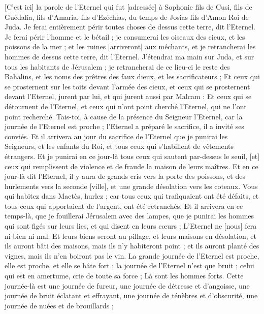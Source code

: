 \BFont
\begin{multicols}{2}
\VerseOne{}[C'est ici] la parole de l'Eternel qui fut [adressée] à Sophonie fils de Cusi, fils de Guédalia, fils d'Amaria, fils d'Ezéchias, du temps de Josias fils d'Amon Roi de Juda.
Je ferai entièrement périr toutes choses de dessus cette terre, dit l'Eternel.
Je ferai périr l'homme et le bétail ; je consumerai les oiseaux des cieux, et les poissons de la mer ; et les ruines [arriveront] aux méchants, et je retrancherai les hommes de dessus cette terre, dit l'Eternel.
J'étendrai ma main sur Juda, et sur tous les habitants de Jérusalem ; je retrancherai de ce lieu-ci le reste des Bahalins, et les noms des prêtres des faux dieux, et les sacrificateurs ;
Et ceux qui se prosternent sur les toits devant l'armée des cieux, et ceux qui se prosternent devant l'Eternel, jurent par lui, et qui jurent aussi par Malcam :
Et ceux qui se détournent de l'Eternel, et ceux qui n'ont point cherché l'Eternel, qui ne l'ont point recherché.
Tais-toi, à cause de la présence du Seigneur l'Eternel, car la journée de l'Eternel est proche ; l'Eternel a préparé le sacrifice, il a invité ses conviés.
Et il arrivera au jour du sacrifice de l'Eternel que je punirai les Seigneurs, et les enfants du Roi, et tous ceux qui s'habillent de vêtements étrangers.
Et je punirai en ce jour-là tous ceux qui sautent par-dessus le seuil, [et] ceux qui remplissent de violence et de fraude la maison de leurs maîtres.
Et en ce jour-là dit l'Eternel, il y aura de grands cris vers la porte des poissons, et des hurlements vers la seconde [ville], et une grande désolation vers les coteaux.
Vous qui habitez dans Mactès, hurlez ; car tous ceux qui trafiquaient ont été défaits, et tous ceux qui apportaient de l'argent, ont été retranchés.
Et il arrivera en ce temps-là, que je fouillerai Jérusalem avec des lampes, que je punirai les hommes qui sont figés sur leurs lies, et qui disent en leurs cœurs ; L'Eternel ne [nous] fera ni bien ni mal.
Et leurs biens seront au pillage, et leurs maisons en désolation, et ils auront bâti des maisons, mais ils n'y habiteront point ; et ils auront planté des vignes, mais ils n'en boiront pas le vin.
La grande journée de l'Eternel est proche, elle est proche, et elle se hâte fort ; la journée de l'Eternel n'est que bruit ; celui qui est en amertume, crie de toute sa force ; Là sont les hommes forts.
Cette journée-là est une journée de fureur, une journée de détresse et d'angoisse, une journée de bruit éclatant et effrayant, une journée de ténèbres et d'obscurité, une journée de nuées et de brouillards ;

\end{multicols}
